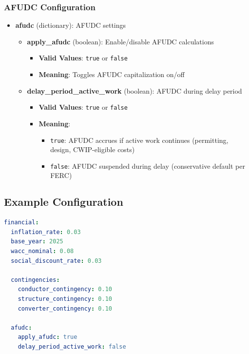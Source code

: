 \documentclass[ctcc_full_documentation.tex]{subfiles}
\begin{document}
\subsubsection{AFUDC Configuration}

\begin{itemize}
    \item \textbf{afudc} (dictionary): AFUDC settings
    \begin{itemize}
        \item \textbf{apply\_afudc} (boolean): Enable/disable AFUDC calculations
        \begin{itemize}
            \item \textbf{Valid Values}: \texttt{true} or \texttt{false}
            \item \textbf{Meaning}: Toggles AFUDC capitalization on/off
        \end{itemize}
        
        \item \textbf{delay\_period\_active\_work} (boolean): AFUDC during delay period
        \begin{itemize}
            \item \textbf{Valid Values}: \texttt{true} or \texttt{false}
            \item \textbf{Meaning}: 
            \begin{itemize}
                \item \texttt{true}: AFUDC accrues if active work continues (permitting, design, CWIP-eligible costs)
                \item \texttt{false}: AFUDC suspended during delay (conservative default per FERC)
            \end{itemize}
        \end{itemize}
    \end{itemize}
\end{itemize}

\subsection{Example Configuration}

\begin{lstlisting}[language=yaml]
financial:
  inflation_rate: 0.03
  base_year: 2025
  wacc_nominal: 0.08
  social_discount_rate: 0.03

  contingencies:
    conductor_contingency: 0.10
    structure_contingency: 0.10
    converter_contingency: 0.10

  afudc:
    apply_afudc: true
    delay_period_active_work: false
\end{lstlisting}
\end{document}

